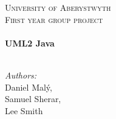 
\begin{titlepage}



\begin{center}

{\vspace*{8.5cm}}



\textsc{\LARGE University of Aberystwyth}\\[1.5cm]

\textsc{\Large First year group project}\\[0.5cm]


\HRule \\[0.4cm]
{ \huge \bfseries UML2 Java}\\[0.4cm]

\HRule \\[1.5cm]

\begin{minipage}{0.4\textwidth}
\begin{center} \large
\emph{Authors:}\\
Daniel Mal\'{y},\\ Samuel Sherar,\\ Lee Smith
\end{center}
\end{minipage}

\vfill


\end{center}

\end{titlepage}
